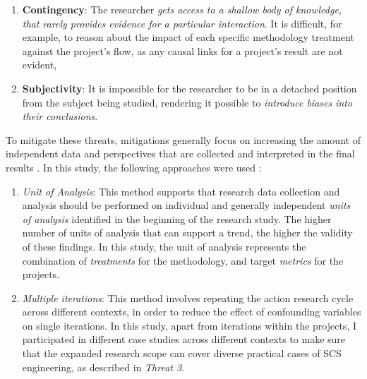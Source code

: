 \documentclass[a4paper,nobib,justified,final]{tufte-book}
\begin{document}
\begin{fullwidth}
\begin{enumerate}
\begin{enumerate}[itemsep=-1pt]
		A critical result of this threat, combined with the iterative nature of action research, is that no case study was performed with the complete methodology applied (or not applied). Instead, all case studies involved the application of \emph{most} aspects of the methodology on them, with the complete application being evaluated based on the counter-factual inference.
		\item \textbf{Contingency}: The researcher \emph{gets access to a shallow body of knowledge, that rarely provides evidence for a particular interaction}. It is difficult, for example, to reason about the impact of each specific methodology treatment against the project's flow, as any causal links for a project's result are not evident, 
		\item \textbf{Subjectivity}: It is impossible for the researcher to be in a detached position from the subject being studied, rendering it possible to \emph{introduce biases into their conclusions}.
	\end{enumerate}

	To mitigate these threats, mitigations generally focus on increasing the amount of independent data and perspectives that are collected and interpreted in the final results \cite{kockThreeThreatsAction2004,yinCaseStudyResearch2014,creswellResearchDesignQualitative2023}. In this study, the following approaches were used \cite{kockThreeThreatsAction2004}:
	\begin{enumerate}[itemsep=-1pt]
		\item \emph{Unit of Analysis}: This method supports that research data collection and analysis should be performed on individual and generally independent \emph{units of analysis} identified in the beginning of the research study. The higher number of units of analysis that can support a trend, the higher the validity of these findings. In this study, the unit of analysis represents the combination of \emph{treatments} for the methodology, and target \emph{metrics} for the projects.
		\item \emph{Multiple iterations}: This method involves repeating the action research cycle across different contexts, in order to reduce the effect of confounding variables on single iterations. In this study, apart from iterations within the projects, I participated in different case studies across different contexts to make sure that the expanded research scope can cover diverse practical cases of \acs{SCS} engineering, as described in \emph{Threat 3}.
	\end{enumerate}


\end{enumerate}
\end{fullwidth}
\end{document}
